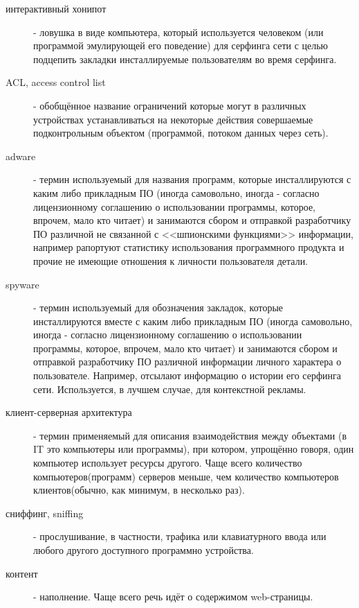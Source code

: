 \begin{description}
\item[интерактивный хонипот]
 - ловушка в виде компьютера, который используется человеком (или программой эмулирующей его поведение) для серфинга сети с целью
 подцепить закладки инсталлируемые пользователям во время серфинга.

\item[ACL, access control list ]
 - обобщённое название ограничений которые могут в различных устройствах устанавливаться
 на некоторые действия совершаемые подконтрольным объектом (программой, потоком данных через сеть).

\item[adware]
 - термин используемый для названия программ, которые инсталлируются с каким либо
 прикладным ПО (иногда самовольно, иногда - согласно лицензионному соглашению о
 использовании программы, которое, впрочем, мало кто читает) и занимаются сбором
 и отправкой разработчику ПО различной не связанной с <<шпионскими функциями>>
 информации, например рапортуют статистику использования программного продукта и
 прочие не имеющие отношения к личности пользователя детали.

\item[spyware]
 - термин используемый для обозначения закладок, которые инсталлируются вместе с
каким либо прикладным ПО (иногда самовольно, иногда - согласно лицензионному
соглашению о использовании программы, которое, впрочем, мало кто читает) и
занимаются сбором и отправкой разработчику ПО различной информации личного
 характера о пользователе. Например, отсылают информацию о истории его серфинга сети.
Используется, в лучшем случае, для контекстной рекламы.

\item[клиент-серверная архитектура]
 - термин применяемый для описания взаимодействия между объектами (в IT это компьютеры
 или программы), при котором, упрощённо говоря, один компьютер использует ресурсы другого.
 Чаще всего количество компьютеров(программ) серверов меньше, чем количество компьютеров
 клиентов(обычно, как  минимум,  в несколько раз).

\item [ сниффинг, sniffing ]
 - прослушивание, в частности, трафика или клавиатурного ввода или любого другого доступного программно устройства.

\item [ контент ]
 - наполнение. Чаще всего речь идёт о содержимом web-страницы.


\end{description}
